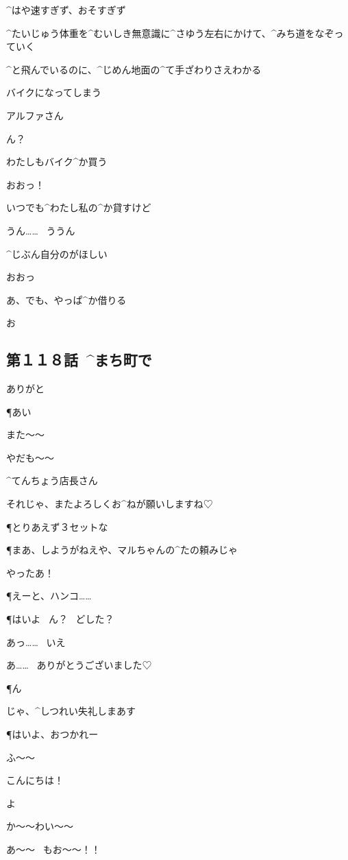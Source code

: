 \page
\M ^{はや}{速}すぎず、おそすぎず

\M ^{たいじゅう}{体重}を^{むいしき}{無意識}に^{さゆう}{左右}にかけて、^{みち}{道}をなぞっていく

\M ^{と}{飛}んでいるのに、^{じめん}{地面}の^{て}{手}ざわりさえわかる

\M バイクになってしまう

\page
\M アルファさん

\A ん？

\M わたしもバイク^{か}{買}う

\A おおっ！

\A いつでも^{わたし}{私}の^{か}{貸}すけど

\M うん……
\ ううん

\M ^{じぶん}{自分}のがほしい

\A おおっ

\page
\M あ、でも、やっぱ^{か}{借}りる

\A お


\subsection{第１１８話\ ^{まち}{町}で}

\page[102]
\A ありがと

\P あい

\page
\R また〜〜

\R やだも〜〜

\R ^{てんちょう}{店長}さん

\R それじゃ、またよろしくお^{ねが}{願}いしますね♡

\P とりあえず３セットな

\P まあ、しようがねえや、マルちゃんの^{たの}{頼}みじゃ

\R やったあ！

\page
\P えーと、ハンコ……

\P はいよ
\ ん？
\ どした？

\R あっ……
\ いえ

\page
\R あ……
\ ありがとうございました♡

\P ん

\R じゃ、^{しつれい}{失礼}しまあす

\P はいよ、おつかれー

\page
\R ふ〜〜

\A こんにちは！

\R よ

\A か〜〜わい〜〜

\R あ〜〜
\ もお〜〜！！

